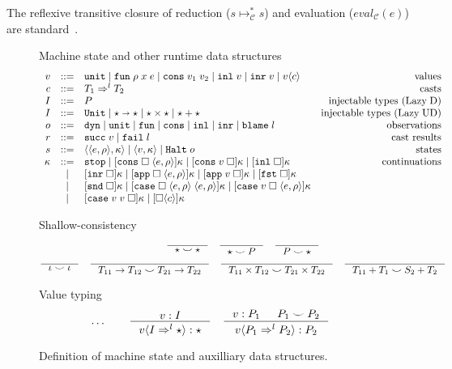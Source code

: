 \documentclass[acmsmall,review,anonymous]{acmart}\settopmatter{printfolios=true,printccs=false,printacmref=false}
\newcommand{\stxrule}[3]{#1 & ::= & #3 & \text{#2}\\}
\newcommand{\stxrulecont}[1]{& | & #1 & \\}
\newcommand{\plus}[0]{+}
\newcommand{\lazyUD}{Lazy\;UD}
\newcommand{\lazyD}{Lazy\;D}
\newcommand{\sOOinspect}[3]{\langle\langle#1,#2\rangle,#3\rangle}
\newcommand{\sOOreturn}[2]{\langle#1,#2\rangle}
\newcommand{\sOOhalt}[1]{\mathtt{Halt} \; #1}
\newcommand{\TOOdyn}[0]{\star}
\newcommand{\POOunit}[0]{\mathtt{Unit}}
\newcommand{\POOfun}[2]{#1 \shortrightarrow #2}
\newcommand{\cOOcast}[3]{#1 \Rightarrow^{#2} #3}
\newcommand{\oOOinj}{\mathtt{dyn}}
\newcommand{\oOOsole}{\mathtt{unit}}
\newcommand{\oOOfun}{\mathtt{fun}}
\newcommand{\oOOcons}{\mathtt{cons}}
\newcommand{\oOOinl}{\mathtt{inl}}
\newcommand{\oOOinr}{\mathtt{inr}}
\newcommand{\oOOblame}[1]{\mathtt{blame} \; #1}
\newcommand{\vOOcast}[2]{#1\langle#2\rangle}
\newcommand{\vOOfun}[3]{\mathtt{fun} \; #1 \; #2 \; #3}
\newcommand{\vOOtt}[0]{\mathtt{unit}}
\newcommand{\vOOcons}[2]{\mathtt{cons}\;#1\;#2}
\newcommand{\vOOinl}[1]{\mathtt{inl}\;#1}
\newcommand{\vOOinr}[1]{\mathtt{inr}\;#1}
\newcommand{\rOOsucc}[1]{\mathtt{succ}\;#1}
\newcommand{\rOOfail}[1]{\mathtt{fail}\;#1}
\newcommand{\kOOmt}[0]{\mathtt{stop}}
\newcommand{\kOOconsI}[3]{[\mathtt{cons} \; \square \; \langle#1,#2\rangle ]#3}
\newcommand{\kOOconsII}[2]{[\mathtt{cons} \; #1 \; \square]#2}
\newcommand{\kOOinl}[1]{[\mathtt{inl} \; \square]#1}
\newcommand{\kOOinr}[1]{[\mathtt{inr} \; \square]#1}
\newcommand{\kOOappI}[3]{
	[\mathtt{app} \; \square \; \langle#1,#2\rangle ]#3
}
\newcommand{\kOOappII}[2]{
	[\mathtt{app} \; #1 \; \square]#2}
\newcommand{\kOOcar}[1]{[\mathtt{fst} \; \square]#1}
\newcommand{\kOOcdr}[1]{[\mathtt{snd} \; \square]#1}
\newcommand{\kOOcaseI}[4]{
	[\mathtt{case} \; \square \; \langle#1,#3\rangle \; \langle#2,#3\rangle ]#4}
\newcommand{\kOOcaseII}[4]{
	[\mathtt{case} \; #1 \; \square \; \langle#2,#3\rangle ]#4}
\newcommand{\kOOcaseIII}[3]{
	[\mathtt{case} \; #1 \; #2 \; \square]#3}
\newcommand{\kOOcast}[2]{
	[\square \langle #1 \rangle]#2}
\newcommand{\judgeCreduceTrans}[2]{#1 \longmapsto_{\mathcal{C}}^{*} #2}
\begin{document}
The reflexive transitive closure of reduction ($\judgeCreduceTrans{s}{s}$) and 
evaluation ($eval_\mathcal{C}(e)$)
are standard~\citep{felleisen03:_pllc}.


\begin{figure}
  Machine state and other runtime data structures
  \[
  \begin{array}{rclr}
	\stxrule{v}{values}{
		\vOOtt{} \mid
		\vOOfun{\rho}{x}{e} \mid
		\vOOcons{v_1}{v_2} \mid
		\vOOinl{v} \mid
		\vOOinr{v} \mid		
		\vOOcast{v}{c}
	}
	\stxrule{c}{casts}{
		\cOOcast{T_1}{l}{T_2}
	}
	\stxrule{I}{injectable types (\lazyD)}{
		P
	}
	\stxrule{I}{injectable types (\lazyUD)}{
		\POOunit \mid
		\POOfun{\star}{\star} \mid
		\star \times \star \mid
		\star + \star
	}
	\stxrule{o}{observations}{
		\oOOinj \mid
		\oOOsole \mid
		\oOOfun \mid
		\oOOcons \mid
		\oOOinl \mid
		\oOOinr \mid
		\oOOblame{l}
	}
	\stxrule{r}{cast results}{
		\rOOsucc{v} \mid
		\rOOfail{l}
	}
	\stxrule{s}{states}{
		\sOOinspect{e}{\rho}{\kappa} \mid{}
		\sOOreturn{v}{\kappa} \mid{}
		\sOOhalt{o}
	}
	\stxrule{\kappa}{continuations}{
		\kOOmt \mid
		\kOOconsI{e}{\rho}{\kappa} \mid
		\kOOconsII{v}{\kappa} \mid
		\kOOinl{\kappa}
	}
	\stxrulecont{
		\kOOinr{\kappa} \mid
		\kOOappI{e}{\rho}{\kappa} \mid
		\kOOappII{v}{\kappa} \mid
		\kOOcar{\kappa}
	}
	\stxrulecont{	
		\kOOcdr{\kappa}\mid
		\kOOcaseI{e}{e}{\rho}{\kappa}\mid
		\kOOcaseII{v}{e}{\rho}{\kappa}
	}
	\stxrulecont{
		\kOOcaseIII{v}{v}{\kappa} \mid
		\kOOcast{c}{\kappa}
	}
  \end{array}
  \]

        Shallow-consistency
	\begin{gather*}
	\inference{}{
		\star \smile \star
	} \quad
	\inference{}{
		\star \smile P
	} \quad
	\inference{}{
		P \smile \star
	} \\
	\inference{}{
		\iota \smile \iota
	} \quad
	\inference{}{
		T_{11} \rightarrow T_{12} \smile T_{21} \rightarrow T_{22}
	} \quad
	\inference{}{
		T_{11} \times T_{12} \smile T_{21} \times T_{22}
	} \quad
	\inference{}{
	T_{11} \plus T_1 \smile S_2 \plus T_2
	}
	\end{gather*}
	
	Value typing 
	\begin{gather*}
	\dots \qquad
	\inference{
		v : I
	}{
		\vOOcast{v}{\cOOcast{I}{l}{\TOOdyn}} : \TOOdyn
	}
	\quad
	\inference{
		v : P_1 &
		P_1 \smile P_2
	}{
		\vOOcast{v}{\cOOcast{P_1}{l}{P_2}} : P_2
	}
	\end{gather*}
        \caption{Definition of machine state and auxilliary data
          structures.}
        \label{fig:state}
\end{figure}
\end{document}
